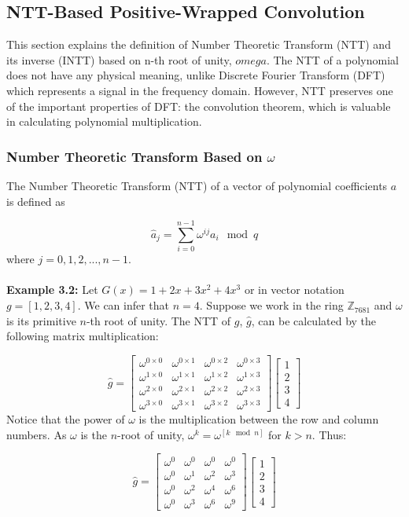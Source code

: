 \documentclass[12pt]{report}
\begin{document}
\subsection{NTT-Based Positive-Wrapped Convolution}
This section explains the definition of Number Theoretic Transform (NTT) and its inverse (INTT) based on n-th root of unity, $omega$. The NTT of a polynomial does not have any physical meaning, unlike Discrete Fourier Transform (DFT) which represents a signal in the frequency domain. However, NTT preserves one of the important properties of DFT: the convolution theorem, which is valuable in calculating polynomial multiplication.

\subsubsection{Number Theoretic Transform Based on $\omega$}

The Number Theoretic Transform (NTT) of a vector of polynomial coefficients $a$ is defined as

\[\hat{a}_{j}=\sum_{i=0}^{n-1}\omega^{ij}a_{i} \mod q\]
where $j=0,1,2,...,n-1$.\\ \\
\textbf{Example 3.2:} Let $G(x)=1+2x+3x^{2}+4x^{3}$ or in vector notation $g=[1,2,3,4].$ We can infer that $n=4.$ Suppose we work in the ring $\mathbb{Z}_{7681}$ and $\omega$ is its primitive $n$-th root of unity. The NTT of $g$, $\hat{g}$, can be calculated by the following matrix multiplication:

\[\hat{g}=\begin{bmatrix}\omega^{0\times0}&\omega^{0\times1}&\omega^{0\times2}&\omega^{0\times3}\\ \omega^{1\times0}&\omega^{1\times1}&\omega^{1\times2}&\omega^{1\times3}\\ \omega^{2\times0}&\omega^{2\times1}&\omega^{2\times2}&\omega^{2\times3}\\ \omega^{3\times0}&\omega^{3\times1}&\omega^{3\times2}&\omega^{3\times3}\end{bmatrix}\begin{bmatrix}1\\ 2\\ 3\\ 4\end{bmatrix}\]
Notice that the power of $\omega$ is the multiplication between the row and column numbers. As $\omega$ is the $n$-root of unity, $\omega^{k}=\omega^{[k \mod n]}$ for $k>n.$ Thus:

\[\hat{g}=\begin{bmatrix}\omega^{0}&\omega^{0}&\omega^{0}&\omega^{0}\\ \omega^{0}&\omega^{1}&\omega^{2}&\omega^{3}\\ \omega^{0}&\omega^{2}&\omega^{4}&\omega^{6}\\ \omega^{0}&\omega^{3}&\omega^{6}&\omega^{9}\end{bmatrix}\begin{bmatrix}1\\ 2\\ 3\\ 4\end{bmatrix}\]
\end{document}
